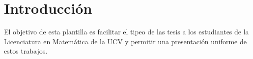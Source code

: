 \chapter*{Introducci\'on}

El objetivo de esta plantilla es facilitar el  tipeo de las tesis a los estudiantes de la
Licenciatura en Matem\'atica de la UCV y permitir una presentaci\'on uniforme de estos
trabajos.
